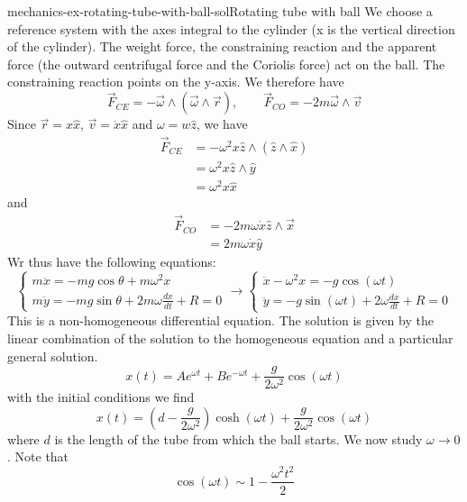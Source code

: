 \documentclass[preview]{standalone}
\begin{document}
\begin{snippetsolution}{mechanics-ex-rotating-tube-with-ball-sol}{Rotating tube with ball}
    We choose a reference system with the axes integral to the cylinder (x is the vertical direction of the cylinder).
    The weight force, the constraining reaction and the apparent force (the outward centrifugal force and the Coriolis force)
    act on the ball. The constraining reaction points on the y-axis.
    We therefore have
    \[
        \vec{F}_{CE} = -\vec{\omega} \wedge (\vec{\omega} \wedge \vec{r}), \qquad \vec{F}_{CO} = -2m\vec{\omega} \wedge \vec{v}
    \]
    Since \(\vec{r} = x\hat{x}\), \(\vec{v} = \dot{x}\hat{x}\) and \(\omega = w\hat{z}\),
    we have
    \begin{align*}
        \vec{F}_{CE} &= -\omega^2 x \hat{z} \wedge (\hat{z} \wedge \hat{x}) \\
        &= \omega^2 x \hat{z} \wedge \hat{y} \\
        &= \omega^2 x \hat{x}
    \end{align*}
    and
    \begin{align*}
        \vec{F}_{CO} &= -2m\omega \dot{x} \hat{z} \wedge \vec{x} \\
        &= 2m\omega \dot{x} \hat{y}
    \end{align*}
    Wr thus have the following equations:
    \[
        \begin{cases}
            m\ddot{x} = -mg\cos\theta + m\omega^2 x \\
            m\ddot{y} = -mg\sin\theta + 2m\omega \frac{dx}{dt} + R = 0
        \end{cases}
        \to
        \begin{cases}
            \ddot{x} - \omega^2 x = -g\cos(\omega t) \\
            \ddot{y} = -g\sin(\omega t) + 2\omega \frac{dx}{dt} + R = 0
        \end{cases}
    \]
    This is a non-homogeneous differential equation. The solution
    is given by the linear combination of the solution to the homogeneous equation and a particular
    general solution.
    \[
        x(t) = Ae^{\omega t} + Be^{-\omega t} + \frac{g}{2\omega^2}\cos(\omega t)
    \]
    with the initial conditions we find
    \[
        x(t) = \left(d-\frac{g}{2\omega^2}\right)
        \cosh(\omega t) + \frac{g}{2\omega^2}\cos(\omega t)
    \]
    where \(d\) is the length of the tube from which the ball starts.
    We now study \(\omega \to 0\).
    Note that
    \[
        \cos(\omega t) \sim 1 - \frac{\omega^2 t^2}{2}
\]
\end{snippetsolution}
\end{document}
